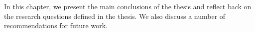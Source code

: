 In this chapter, we present the main conclusions of the thesis and reflect back on the research questions defined in the thesis. We also discuss a number of recommendations for future work. %